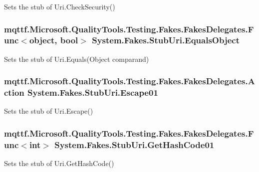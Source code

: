 Sets the stub of Uri.\-Check\-Security()

\hypertarget{class_system_1_1_fakes_1_1_stub_uri_a0b77e9c3b21b1d7f78a8173f52fe16b0}{
\subsubsection[{Equals\-Object}]{\setlength{\rightskip}{0pt plus 5cm}mqttf.\-Microsoft.\-Quality\-Tools.\-Testing.\-Fakes.\-Fakes\-Delegates.\-Func$<$object, bool$>$ System.\-Fakes.\-Stub\-Uri.\-Equals\-Object}}\label{class_system_1_1_fakes_1_1_stub_uri_a0b77e9c3b21b1d7f78a8173f52fe16b0}


Sets the stub of Uri.\-Equals(\-Object comparand)

\hypertarget{class_system_1_1_fakes_1_1_stub_uri_abb95e900aac9932a06966dbe5f15e696}{
\subsubsection[{Escape01}]{\setlength{\rightskip}{0pt plus 5cm}mqttf.\-Microsoft.\-Quality\-Tools.\-Testing.\-Fakes.\-Fakes\-Delegates.\-Action System.\-Fakes.\-Stub\-Uri.\-Escape01}}\label{class_system_1_1_fakes_1_1_stub_uri_abb95e900aac9932a06966dbe5f15e696}


Sets the stub of Uri.\-Escape()

\hypertarget{class_system_1_1_fakes_1_1_stub_uri_a0dae92a8ab0af4633382d6fad1856e41}{
\subsubsection[{Get\-Hash\-Code01}]{\setlength{\rightskip}{0pt plus 5cm}mqttf.\-Microsoft.\-Quality\-Tools.\-Testing.\-Fakes.\-Fakes\-Delegates.\-Func$<$int$>$ System.\-Fakes.\-Stub\-Uri.\-Get\-Hash\-Code01}}\label{class_system_1_1_fakes_1_1_stub_uri_a0dae92a8ab0af4633382d6fad1856e41}


Sets the stub of Uri.\-Get\-Hash\-Code()

